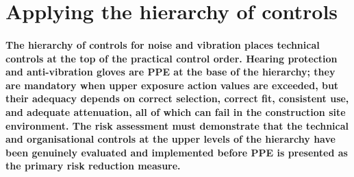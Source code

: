 \section{Applying the hierarchy of controls}

\paragraph{The hierarchy of controls for noise and vibration places technical controls at the top of the practical control order. Hearing protection and anti-vibration gloves are PPE at the base of the hierarchy; they are mandatory when upper exposure action values are exceeded, but their adequacy depends on correct selection, correct fit, consistent use, and adequate attenuation, all of which can fail in the construction site environment. The risk assessment must demonstrate that the technical and organisational controls at the upper levels of the hierarchy have been genuinely evaluated and implemented before PPE is presented as the primary risk reduction measure.}

